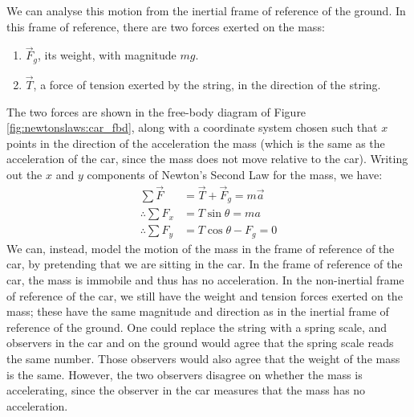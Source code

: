 We can analyse this motion from the inertial frame of reference of the ground. In this frame of reference, there are two forces exerted on the mass:
\begin{enumerate}
\item $\vec F_g$, its weight, with magnitude $mg$.
\item $\vec T$, a force of tension exerted by the string, in the direction of the string.
\end{enumerate}
The two forces are shown in the free-body diagram of Figure \ref{fig:newtonslaws:car_fbd}, along with a coordinate system chosen such that $x$ points in the direction of the acceleration the mass (which is the same as the acceleration of the car, since the mass does not move relative to the car). 
Writing out the $x$ and $y$ components of Newton's Second Law for the mass, we have:
\begin{align*}
\sum \vec F &= \vec T + \vec F_g= m \vec a\\
\therefore\sum F_x &= T\sin\theta = ma\\
\therefore\sum F_y &= T\cos\theta-F_g=0
\end{align*}
We can, instead, model the motion of the mass in the frame of reference of the car, by pretending that we are sitting in the car. In the frame of reference of the car, the mass is immobile and thus has no acceleration. In the non-inertial frame of reference of the car, we still have the weight and tension forces exerted on the mass; these have the same magnitude and direction as in the inertial frame of reference of the ground. One could replace the string with a spring scale, and observers in the car and on the ground would agree that the spring scale reads the same number. Those observers would also agree that the weight of the mass is the same. However, the two observers disagree on whether the mass is accelerating, since the observer in the car measures that the mass has no acceleration.

